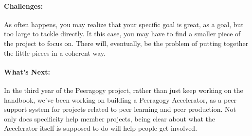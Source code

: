 \paragraph{Challenges:} As often happens, you may realize that your
specific goal is great, as a goal, but too large to tackle directly. It
this case, you may have to find a smaller piece of the project to focus
on. There will, eventually, be the problem of putting together the
little pieces in a coherent way.

\paragraph{What's Next:} In the third year of the Peeragogy project, rather
than just keep working on the handbook, we've been working on building a
Peeragogy Accelerator, as a peer support system for projects related to
peer learning and peer production. Not only does specificity help member
projects, being clear about what the Accelerator itself is supposed to
do will help people get involved.
